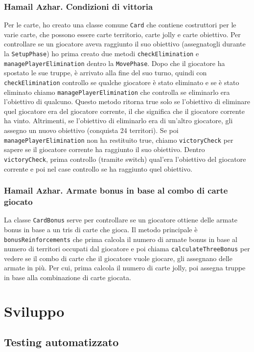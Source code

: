 \documentclass[a4paper,12pt]{report}
\begin{document}
\subsection{Hamail Azhar. Condizioni di vittoria}
Per le carte, ho creato una classe comune \texttt{Card} che contiene costruttori per le varie carte, che possono essere carte territorio, carte jolly e carte obiettivo. Per controllare se un giocatore aveva raggiunto il suo obiettivo (assegnatogli durante la \texttt{SetupPhase}) ho prima creato due metodi \texttt{checkElimination} e \texttt{managePlayerElimination} dentro la \texttt{MovePhase}. Dopo che il giocatore ha spostato le sue truppe, è arrivato alla fine del suo turno, quindi con \texttt{checkElimination} controllo se qualche giocatore è stato eliminato e se è stato eliminato chiamo \texttt{managePlayerElimination} che controlla se eliminarlo era l'obiettivo di qualcuno. Questo metodo ritorna true solo se l'obiettivo di eliminare quel giocatore era del giocatore corrente, il che significa che il giocatore corrente ha vinto. Altrimenti, se l'obiettivo di eliminarlo era di un'altro giocatore, gli assegno un nuovo obiettivo (conquista 24 territori).
Se poi \texttt{managePlayerElimination} non ha restituito true, chiamo \texttt{victoryCheck} per sapere se il giocatore corrente ha raggiunto il suo obiettivo. Dentro \texttt{victoryCheck}, prima controllo (tramite switch) qual'era l'obiettivo del giocatore corrente e poi nel case controllo se ha raggiunto quel obiettivo.

\subsection{Hamail Azhar. Armate bonus in base al combo di carte giocato}
La classe \texttt{CardBonus} serve per controllare se un giocatore ottiene delle armate bonus in base a un tris di carte che gioca. Il metodo principale è \texttt{bonusReinforcements} che prima calcola il numero di armate bonus in base al numero di territori occupati dal giocatore e poi chiama \texttt{calculateThreeBonus} per vedere se il combo di carte che il giocatore vuole giocare, gli assegnano delle armate in più. Per cui, prima calcola il numero di carte jolly, poi assegna truppe in base alla combinazione di carte giocata.

\chapter{Sviluppo}
\section{Testing automatizzato}
\end{document}
